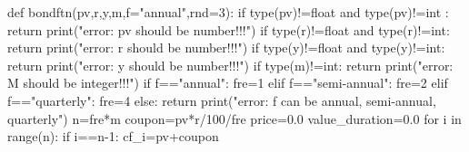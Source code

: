 \documentclass[
  a4paper,
  DIV=11,
  numbers=noendperiod]{scrreprt}
\newenvironment{Shaded}{\begin{snugshade}}{\end{snugshade}}
\newcommand{\BuiltInTok}[1]{\textcolor[rgb]{0.00,0.23,0.31}{#1}}
\newcommand{\ControlFlowTok}[1]{\textcolor[rgb]{0.00,0.23,0.31}{#1}}
\newcommand{\DecValTok}[1]{\textcolor[rgb]{0.68,0.00,0.00}{#1}}
\newcommand{\FloatTok}[1]{\textcolor[rgb]{0.68,0.00,0.00}{#1}}
\newcommand{\KeywordTok}[1]{\textcolor[rgb]{0.00,0.23,0.31}{#1}}
\newcommand{\NormalTok}[1]{\textcolor[rgb]{0.00,0.23,0.31}{#1}}
\newcommand{\OperatorTok}[1]{\textcolor[rgb]{0.37,0.37,0.37}{#1}}
\newcommand{\StringTok}[1]{\textcolor[rgb]{0.13,0.47,0.30}{#1}}
\begin{document}
\begin{Shaded}
\begin{Highlighting}[]
\KeywordTok{def}\NormalTok{ bondftn(pv,r,y,m,f}\OperatorTok{=}\StringTok{"annual"}\NormalTok{,rnd}\OperatorTok{=}\DecValTok{3}\NormalTok{):}
    \ControlFlowTok{if} \BuiltInTok{type}\NormalTok{(pv)}\OperatorTok{!=}\BuiltInTok{float} \KeywordTok{and} \BuiltInTok{type}\NormalTok{(pv)}\OperatorTok{!=}\BuiltInTok{int}\NormalTok{ : }\ControlFlowTok{return} \BuiltInTok{print}\NormalTok{(}\StringTok{"error: pv should be number!!!"}\NormalTok{)}
    \ControlFlowTok{if} \BuiltInTok{type}\NormalTok{(r)}\OperatorTok{!=}\BuiltInTok{float} \KeywordTok{and} \BuiltInTok{type}\NormalTok{(r)}\OperatorTok{!=}\BuiltInTok{int}\NormalTok{: }\ControlFlowTok{return} \BuiltInTok{print}\NormalTok{(}\StringTok{"error: r should be number!!!"}\NormalTok{)}
    \ControlFlowTok{if} \BuiltInTok{type}\NormalTok{(y)}\OperatorTok{!=}\BuiltInTok{float} \KeywordTok{and} \BuiltInTok{type}\NormalTok{(y)}\OperatorTok{!=}\BuiltInTok{int}\NormalTok{: }\ControlFlowTok{return} \BuiltInTok{print}\NormalTok{(}\StringTok{"error: y should be number!!!"}\NormalTok{)}
    \ControlFlowTok{if} \BuiltInTok{type}\NormalTok{(m)}\OperatorTok{!=}\BuiltInTok{int}\NormalTok{: }\ControlFlowTok{return} \BuiltInTok{print}\NormalTok{(}\StringTok{"error: M should be integer!!!"}\NormalTok{)}
    \ControlFlowTok{if}\NormalTok{ f}\OperatorTok{==}\StringTok{"annual"}\NormalTok{: fre}\OperatorTok{=}\DecValTok{1}
    \ControlFlowTok{elif}\NormalTok{ f}\OperatorTok{==}\StringTok{"semi{-}annual"}\NormalTok{: fre}\OperatorTok{=}\DecValTok{2}
    \ControlFlowTok{elif}\NormalTok{ f}\OperatorTok{==}\StringTok{"quarterly"}\NormalTok{: fre}\OperatorTok{=}\DecValTok{4}
    \ControlFlowTok{else}\NormalTok{: }\ControlFlowTok{return} \BuiltInTok{print}\NormalTok{(}\StringTok{"error: f can be \textquotesingle{}annual\textquotesingle{}, \textquotesingle{}semi{-}annual\textquotesingle{}, \textquotesingle{}quarterly\textquotesingle{}"}\NormalTok{)}
\NormalTok{    n}\OperatorTok{=}\NormalTok{fre}\OperatorTok{*}\NormalTok{m}
\NormalTok{    coupon}\OperatorTok{=}\NormalTok{pv}\OperatorTok{*}\NormalTok{r}\OperatorTok{/}\DecValTok{100}\OperatorTok{/}\NormalTok{fre}
\NormalTok{    price}\OperatorTok{=}\FloatTok{0.0}
\NormalTok{    value\_duration}\OperatorTok{=}\FloatTok{0.0}
    \ControlFlowTok{for}\NormalTok{ i }\KeywordTok{in} \BuiltInTok{range}\NormalTok{(n):}
        \ControlFlowTok{if}\NormalTok{ i}\OperatorTok{==}\NormalTok{n}\OperatorTok{{-}}\DecValTok{1}\NormalTok{: cf\_i}\OperatorTok{=}\NormalTok{pv}\OperatorTok{+}\NormalTok{coupon}

\end{Highlighting}
\end{Shaded}
\end{document}
